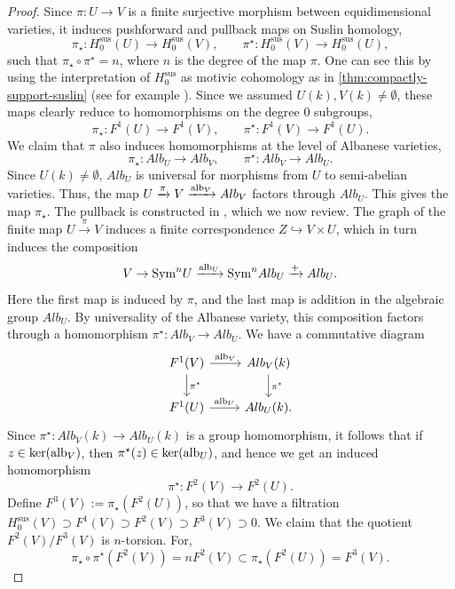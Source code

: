 \documentclass[12pt]{amsart}
\theoremstyle{remark}
\renewcommand{\1}{{\mathbb{S}}}
\newcommand{\alb}{{\rm alb}}
\newcommand{\<}{\langle}
\renewcommand{\>}{\rangle}
\newcommand{\Sym}{{\operatorname{\rm Sym}}}
\newcommand{\Sus}{{\operatorname{sus}}}
\begin{document}
\begin{proof}
Since $\pi:U\to V$ is a finite surjective morphism between equidimensional varieties, it induces pushforward and pullback maps on Suslin homology, 
\[\pi_\star: H_0^\Sus(U)\to H_0^\Sus(V),\;\;\;\;\;\;\;\pi^\star: H_0^\Sus(V)\to H_0^\Sus(U),\] such that $\pi_\star\circ\pi^\star=n$, where $n$ is the degree of the map $\pi$.  
One can see this by using the interpretation of $H_0^\Sus$ as motivic cohomology as in \autoref{thm:compactly-support-suslin} (see for example \cite[p.~5]{Yam1}).  
Since we assumed $U(k), V(k)\neq\emptyset$, these maps clearly reduce to homomorphisms on the degree $0$ subgroups, 
\[\pi_\star: F^1(U)\to F^1(V),\;\;\;\;\;\;\;\pi^\star: F^1(V)\to F^1(U).\] 
We claim that $\pi$ also induces homomorphisms at the level of  Albanese varieties, 
\[\pi_\star: Alb_U\to Alb_V,\;\;\;\;\;\;\;\pi^\star: Alb_V\to Alb_U.\]
Since $U(k)\neq\emptyset$, $Alb_U$ is universal for morphisms from $U$ to semi-abelian varieties. Thus, the map $U\xrightarrow{\pi} V\xrightarrow{\alb_V} Alb_V$ factors through $Alb_U$. This gives the map $\pi_\star$. The pullback is constructed in \cite[p.~5]{SpSz}, which we now review. The graph of the finite map $U\xrightarrow{\pi}V$ induces a finite correspondence $Z\hookrightarrow V\times U$, which in turn induces the composition
\[V\to\Sym^n U\xrightarrow{\alb_U}\Sym^n Alb_U\xrightarrow{+} Alb_U.\] Here the first map is induced by $\pi$, and the last map is addition in the algebraic group $Alb_U$. By universality of the Albanese variety, this composition factors through a homomorphism $\pi^\star:Alb_V\to Alb_U$. 
We have a commutative diagram  
 \[
\begin{tikzcd}
	  F^{1}(V) \arrow[r, "\alb_V"] \arrow[d, "\pi^\star"] & Alb_{V}(k) \arrow[d, "\pi^\star"] \\
	        F^1(U)  \arrow[r, "\alb_U"]                & Alb_{U}(k) .
\end{tikzcd} 
\]  
Since $\pi^\star: Alb_V(k)\to Alb_U(k)$ is a group homomorphism, it follows that if $z\in \ker(\alb_V)$, then $\pi^\star(z)\in\ker(\alb_U)$, and hence we get an induced homomorphism
\[\pi^\star: F^2(V)\to F^2(U).\]
Define $F^3(V):=\pi_\star(F^2(U))$, so that we have a filtration $H_0^\Sus(V)\supset F^1(V)\supset F^2(V)\supset F^3(V)\supset 0$. 
We claim that the quotient $F^2(V)/F^3(V)$ is $n$-torsion. For, 
\[\pi_\star\circ\pi^\star(F^2(V))=nF^2(V)\subset  \pi_\star(F^2(U))=F^3(V).\] 
 


\end{proof}
\end{document}
